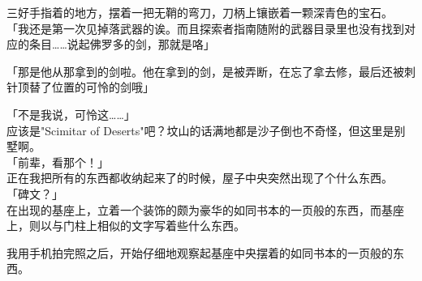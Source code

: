 三好手指着的地方，摆着一把无鞘的弯刀，刀柄上镶嵌着一颗深青色的宝石。\\

「我还是第一次见掉落武器的诶。而且探索者指南随附的武器目录里也没有找到对应的条目……说起佛罗多的剑，那就是咯」

「那是他从那拿到的剑啦。他在拿到的剑，是被弄断，在忘了拿去修，最后还被刺针顶替了位置的可怜的剑哦」

「不是我说，可怜这……」\\

应该是"Scimitar of Deserts"吧？坟山的话满地都是沙子倒也不奇怪，但这里是别墅啊。\\

「前辈，看那个！」\\

正在我把所有的东西都收纳起来了的时候，屋子中央突然出现了个什么东西。\\

「碑文？」\\

在出现的基座上，立着一个装饰的颇为豪华的如同书本的一页般的东西，而基座上，则以与门柱上相似的文字写着些什么东西。

我用手机拍完照之后，开始仔细地观察起基座中央摆着的如同书本的一页般的东西。\\

